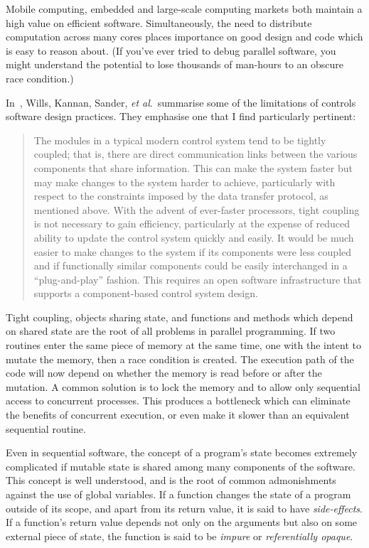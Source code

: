 Mobile computing, embedded and large-scale computing markets both maintain a
high value on efficient software. Simultaneously, the need to distribute
computation across many cores places importance on good design and code which is
easy to reason about. (If you've ever tried to debug parallel software, you
might understand the potential to lose thousands of man-hours to an obscure race
condition.)

 In~\cite[\S5.2.1]{Samad2003}, Wills, Kannan, Sander, \textit{et al}.\ summarise
 some of the limitations of controls software design practices. They emphasise
 one that I find particularly pertinent:
%
\begin{quote}
%
  The modules in a typical modern control system tend to be tightly coupled;
  that is, there are direct communication links between the various components
  that share information. This can make the system faster but may make changes
  to the system harder to achieve, particularly with respect to the constraints
  imposed by the data transfer protocol, as mentioned above. With the advent of
  ever-faster processors, tight coupling is not necessary to gain efficiency,
  particularly at the expense of reduced ability to update the control system
  quickly and easily. It would be much easier to make changes to the system if
  its components were less coupled and if functionally similar components could
  be easily interchanged in a ``plug-and-play'' fashion. This requires an open
  software infrastructure that supports a component-based control system
  design.
%
\end{quote}

Tight coupling, objects sharing state, and functions and methods which depend on
shared state are the root of all problems in parallel programming. If two
routines enter the same piece of memory at the same time, one with the intent to
mutate the memory, then a race condition is created. The execution path of the
code will now depend on whether the memory is read before or after the mutation.
A common solution is to lock the memory and to allow only sequential access to
concurrent processes. This produces a bottleneck which can eliminate the
benefits of concurrent execution, or even make it slower than an equivalent
sequential routine.

Even in sequential software, the concept of a program's state becomes extremely
complicated if mutable state is shared among many components of the software.
This concept is well understood, and is the root of common admonishments against
the use of global variables. If a function changes the state of a program
outside of its scope, and apart from its return value, it is said to have
\emph{side-effects}. If a function's return value depends
not only on the arguments but also on some external piece of state, the function
is said to be \emph{impure} or \emph{referentially
opaque}.

